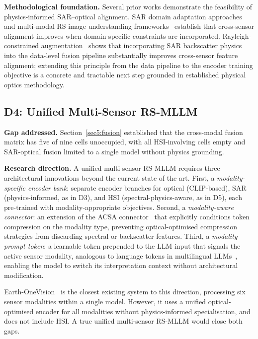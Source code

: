 \textbf{Methodological foundation.} Several prior works demonstrate the
feasibility of physics-informed SAR--optical alignment. SAR domain adaptation
approaches~\cite{schmitt2019fusion} and multi-modal RS image understanding
frameworks~\cite{zhang2024phi} establish that cross-sensor alignment improves
when domain-specific constraints are incorporated. Rayleigh-constrained
augmentation~\cite{rayleigh2026} shows that incorporating SAR backscatter
physics into the data-level fusion pipeline substantially improves cross-sensor
feature alignment; extending this principle from the data pipeline to the
encoder training objective is a concrete and tractable next step grounded
in established physical optics methodology.

\subsection{D4: Unified Multi-Sensor RS-MLLM}\label{sec9:d4}

\textbf{Gap addressed.} Section~\ref{sec5:fusion} established that the
cross-modal fusion matrix has five of nine cells unoccupied, with all
HSI-involving cells empty and SAR-optical fusion limited to a single
model without physics grounding.

\textbf{Research direction.} A unified multi-sensor RS-MLLM requires
three architectural innovations beyond the current state of the art.
First, a \emph{modality-specific encoder bank}: separate encoder branches
for optical (CLIP-based), SAR (physics-informed, as in D3), and HSI
(spectral-physics-aware, as in D5), each pre-trained with modality-appropriate
objectives. Second, a \emph{modality-aware connector}: an extension of
the ACSA connector~\cite{earthonevision2026} that explicitly conditions
token compression on the modality type, preventing optical-optimised
compression strategies from discarding spectral or backscatter features.
Third, a \emph{modality prompt token}: a learnable token prepended to
the LLM input that signals the active sensor modality, analogous to
language tokens in multilingual LLMs~\cite{touvron2023llama}, enabling
the model to switch its interpretation context without architectural
modification.

Earth-OneVision~\cite{earthonevision2026} is the closest existing
system to this direction, processing six sensor modalities within a
single model. However, it uses a unified optical-optimised encoder for
all modalities without physics-informed specialisation, and does not
include HSI. A true unified multi-sensor RS-MLLM would close both gaps.

